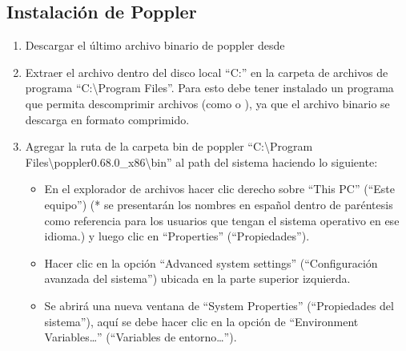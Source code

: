 \documentclass[letterpaper,10pt,openany,spanish]{sphinxmanual}
\begin{document}
\subsection{Instalación de Poppler}
\label{\detokenize{instalacion/instalacion_popple_teseract:instalacion-de-poppler}}\begin{enumerate}
%
\item {} 
Descargar el último archivo binario de poppler desde 

\item {} 
Extraer el archivo dentro del disco local “C:” en la carpeta de archivos de programa “C:\textbackslash{}Program Files”. Para esto debe tener instalado un programa que permita descomprimir archivos (como  o ), ya que el archivo binario se descarga en formato comprimido.

\item {} 
Agregar la ruta de la carpeta bin de poppler “C:\textbackslash{}Program Files\textbackslash{}poppler\sphinxhyphen{}0.68.0\_x86\textbackslash{}bin” al path del sistema haciendo lo siguiente:
\begin{itemize}
\item {} 
En el explorador de archivos hacer clic derecho sobre “This PC” (“Este equipo”) (* se presentarán los nombres en español dentro de paréntesis como referencia para los usuarios que tengan el sistema operativo en ese idioma.) y luego clic en “Properties” (“Propiedades”).

\end{itemize}

\begin{itemize}
\item {} 
Hacer clic en la opción “Advanced system settings” (“Configuración avanzada del sistema”) ubicada en la parte superior izquierda.

\end{itemize}

\begin{itemize}
\item {} 
Se abrirá una nueva ventana de “System Properties” (“Propiedades del sistema”), aquí se debe hacer clic en la opción de “Environment Variables…” (“Variables de entorno…”).


\end{itemize}
\end{enumerate}
\end{document}
